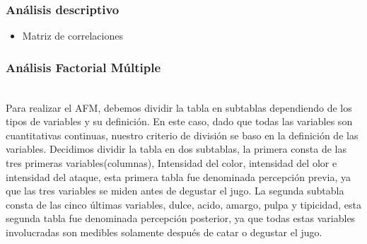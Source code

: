 \documentclass[12pt]{beamer}
\begin{document}
\begin{frame}
\frametitle{Análisis descriptivo}
\begin{itemize}
\item Matriz de correlaciones
\end{itemize}
\begin{center}
\end{center}
\end{frame}

\begin{frame}
\frametitle{Análisis Factorial Múltiple}
~\\Para realizar el AFM, debemos dividir la tabla en subtablas dependiendo de los tipos de variables y su definición. En este caso, dado que todas las variables son cuantitativas continuas, nuestro criterio de división se baso en la definición de las variables. Decidimos dividir la tabla en dos subtablas, la primera consta de las tres primeras variables(columnas), Intensidad del color, intensidad del olor e intensidad del ataque, esta primera tabla fue denominada percepción previa, ya que las tres variables se miden antes de degustar el jugo. La segunda subtabla consta de las cinco últimas variables, dulce, acido, amargo, pulpa y tipicidad, esta segunda tabla fue denominada percepción posterior, ya que todas estas variables involucradas son medibles solamente después de catar o degustar el jugo.
\end{frame}
\end{document}
